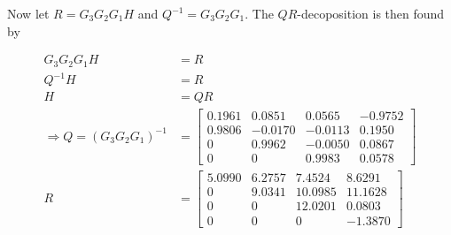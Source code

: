Now let $R = G_3 G_2 G_1 H$ and $Q^{-1} = G_3 G_2 G_1$. The $QR$-decoposition is then found by

\begin{align}
G_3 G_2 G_1 H &= R \\
Q^{-1} H &= R \\
H &= QR \\
\Rightarrow
Q = (G_3 G_2 G_1)^{-1} &= 
  \left[
 \begin{matrix}
    0.1961  &  0.0851 &  0.0565   & -0.9752 \\
    0.9806  & -0.0170 & -0.0113  &  0.1950 \\
    0       &  0.9962 & -0.0050  &  0.0867 \\
    0       &  0      &  0.9983  &  0.0578
 \end{matrix}
 \right] \\
R &= 
  \left[
 \begin{matrix}
    5.0990  &  6.2757 & 7.4524   &  8.6291 \\
    0       &  9.0341 & 10.0985  &  11.1628 \\
    0       &  0      & 12.0201  &   0.0803 \\
    0       &  0      & 0       &  -1.3870
 \end{matrix}
 \right] 
\end{align}


